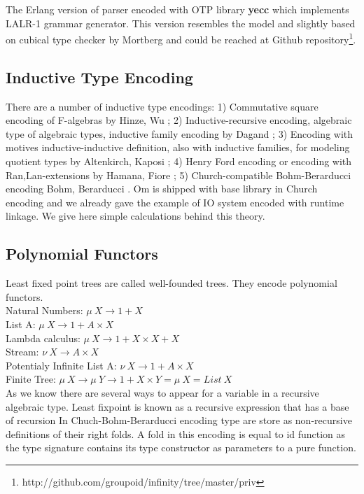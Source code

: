 \documentclass{article}
\begin{document}
The Erlang version of parser encoded with OTP library {\bf yecc} which implements LALR-1 grammar generator.
This version resembles the model and slightly based on cubical type checker by Mortberg\cite{Mortberg17} and could be reached at Github repository\footnote{http://github.com/groupoid/infinity/tree/master/priv}.

\subsection{Inductive Type Encoding}
There are a number of inductive type encodings:
1) Commutative square encoding of F-algebras by Hinze, Wu \cite{Hinze13};
2) Inductive-recursive encoding, algebraic type of algebraic types, inductive family encoding by Dagand \cite{Dagand13};
3) Encoding with motives inductive-inductive definition, also with inductive families, for modeling quotient types by Altenkirch, Kaposi \cite{Kaposi16};
4) Henry Ford encoding or encoding with Ran,Lan-extensions by Hamana, Fiore \cite{Hamana11};
5) Church-compatible Bohm-Berarducci encoding Bohm, Berarducci \cite{Bohm85}.
Om is shipped with base library in Church encoding and we already gave the example of IO system encoded with runtime linkage.
We give here simple calculations behind this theory.

\newpage
\subsection{Polynomial Functors}
Least fixed point trees are called well-founded trees.
They encode polynomial functors.\\

\noindent Natural Numbers: $\mu\ X \rightarrow 1 + X$\\
List A: $\mu\ X \rightarrow 1 + A \times X$\\
Lambda calculus: $\mu\ X \rightarrow 1 + X \times X + X$\\
Stream: $\nu\ X \rightarrow A \times X$\\
Potentialy Infinite List A: $\nu\ X \rightarrow 1 + A \times X$\\
Finite Tree: $\mu\ X \rightarrow \mu\ Y \rightarrow 1 + X \times Y = \mu\ X = List\ X$\\

As we know there are several ways to appear for a variable in a recursive algebraic type.
Least fixpoint is known as a recursive expression that has a base of recursion In Chuch-Bohm-Berarducci encoding type are store as non-recursive definitions of their right folds.
A fold in this encoding is equal to id function as the type signature contains its type constructor as parameters to a pure function.
\end{document}
